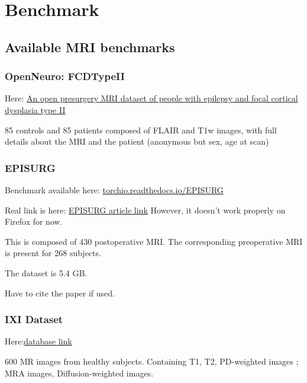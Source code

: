 \chapter{Benchmark}

\section{Available MRI benchmarks}

\subsection{OpenNeuro: FCDTypeII}
\label{dt:benchmark8}

Here: \href{https://openneuro.org/datasets/ds004199/versions/1.0.6}{An open presurgery MRI dataset of people with epilepsy and focal cortical dysplasia type II}

85 controls and 85 patients composed of FLAIR and T1w images, with full details about the MRI and the patient (anonymous but sex, age at scan)

\subsection{EPISURG}

Benchmark available here: \href{https://torchio.readthedocs.io/_modules/torchio/datasets/episurg.html#EPISURG}{torchio.readthedocs.io/EPISURG}

Real link is here: \href{https://rdr.ucl.ac.uk/articles/dataset/EPISURG_a_dataset_of_postoperative_magnetic_resonance_images_MRI_for_quantitative_analysis_of_resection_neurosurgery_for_refractory_epilepsy/9996158/1?file=26153588}{EPISURG article link}
However, it doesn't work properly on Firefox for now.

This is composed of 430 postoperative MRI. The corresponding preoperative MRI is present for 268 subjects.

The dataset is 5.4 GB.

Have to cite the paper if used.

\subsection{IXI Dataset}

Here:\href{https://brain-development.org/ixi-dataset/}{database link}

600 MR images from healthy subjects. Containing T1, T2, PD-weighted images ; MRA images, Diffusion-weighted images.

